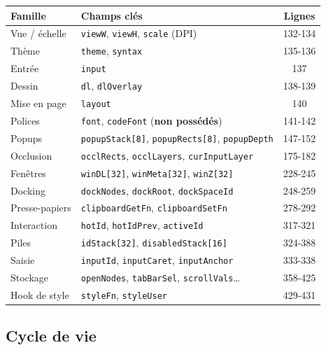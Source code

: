 \begin{center}
\begin{tabular}{@{}llc@{}}
\toprule
\textbf{Famille} & \textbf{Champs clés} & \textbf{Lignes} \\
\midrule
Vue / échelle    & \texttt{viewW}, \texttt{viewH}, \texttt{scale} (DPI)          & 132-134 \\
Thème            & \texttt{theme}, \texttt{syntax}                                & 135-136 \\
Entrée           & \texttt{input}                                                 & 137 \\
Dessin           & \texttt{dl}, \texttt{dlOverlay}                                & 138-139 \\
Mise en page     & \texttt{layout}                                                & 140 \\
Polices          & \texttt{font}, \texttt{codeFont} (\textbf{non possédés})       & 141-142 \\
Popups           & \texttt{popupStack[8]}, \texttt{popupRects[8]}, \texttt{popupDepth} & 147-152 \\
Occlusion        & \texttt{occlRects}, \texttt{occlLayers}, \texttt{curInputLayer} & 175-182 \\
Fenêtres         & \texttt{winDL[32]}, \texttt{winMeta[32]}, \texttt{winZ[32]}    & 228-245 \\
Docking          & \texttt{dockNodes}, \texttt{dockRoot}, \texttt{dockSpaceId}    & 248-259 \\
Presse-papiers   & \texttt{clipboardGetFn}, \texttt{clipboardSetFn}               & 278-292 \\
Interaction      & \texttt{hotId}, \texttt{hotIdPrev}, \texttt{activeId}          & 317-321 \\
Piles            & \texttt{idStack[32]}, \texttt{disabledStack[16]}               & 324-388 \\
Saisie           & \texttt{inputId}, \texttt{inputCaret}, \texttt{inputAnchor}    & 333-338 \\
Stockage         & \texttt{openNodes}, \texttt{tabBarSel}, \texttt{scrollVals}\dots & 358-425 \\
Hook de style    & \texttt{styleFn}, \texttt{styleUser}                           & 429-431 \\
\bottomrule
\end{tabular}
\end{center}

\subsection{Cycle de vie}

